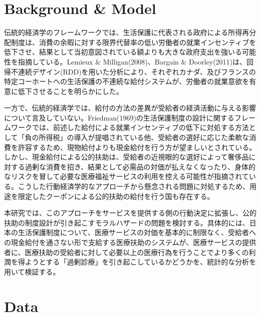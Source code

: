 \documentclass{jsarticle}
\begin{document}
\section{Background \& Model}

伝統的経済学のフレームワークでは、生活保護に代表される政府による所得再分配制度は、消費の余暇に対する限界代替率の低い労働者の就業インセンティブを低下させ、結果として当初意図されている額よりも大きな政府支出を強いる可能性を指摘している。Lemieux \& Milligan(2008)、Bargain \& Doorley(2011)は、回帰不連続デザイン(RDD)を用いた分析により、それぞれカナダ、及びフランスの特定コーホートへの生活保護の不連続な給付システムが、労働者の就業意欲を有意に低下させることを明らかにした。

一方で、伝統的経済学では、給付の方法の差異が受給者の経済活動に与える影響について言及していない。Friedman(1969)の生活保護制度の設計に関するフレームワークでは、前述した給付による就業インセンティブの低下に対処する方法として「負の所得税」の導入が提唱されている他、受給者の選好に応じた柔軟な消費を許容するため、現物給付よりも現金給付を行う方が望ましいとされている。しかし、現金給付による公的扶助は、受給者の近視眼的な選好によって奢侈品に対する過剰な消費を招き、結果として必需品の対価が払えなくなったり、身体的なリスクを冒して必要な医療福祉サービスの利用を控える可能性が指摘されている。こうした行動経済学的なアプローチから懸念される問題に対処するため、用途を限定したクーポンによる公的扶助の給付を行う国も存在する。

本研究では、このアプローチをサービスを提供する側の行動決定に拡張し、公的扶助の制度設計が引き起こすモラルハザードの問題を検討する。具体的には、日本の生活保護制度について、医療サービスの対価を基本的に制限なく、受給者への現金給付を通さない形で支給する医療扶助のシステムが、医療サービスの提供者に、医療扶助の受給者に対して必要以上の医療行為を行うことでより多くの利潤を得ようとする「過剰診療」を引き起こしているかどうかを、統計的な分析を用いて検証する。

\section{Data}
\end{document}
